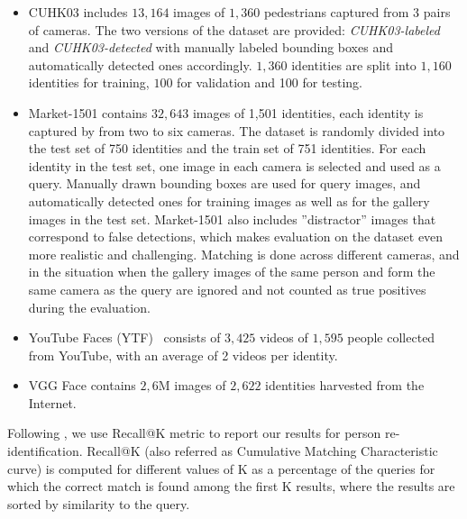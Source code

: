 \begin{itemize}
    \item CUHK03 \citep{Li14} includes $13,164$ images of $1,360$ pedestrians captured from 3 pairs of cameras. The two versions of the dataset are provided: \textit{CUHK03-labeled} and \textit{CUHK03-detected} with manually labeled bounding boxes and automatically detected ones accordingly.  $1,360$ identities are split into $1,160$ identities for training, $100$ for validation and 100 for testing.
    \item Market-1501 \citep{zheng2015scalable} contains $32,643$ images of 1,501 identities, each identity is captured by from two to six cameras. The dataset is randomly divided into the test set of 750 identities and the train set of 751 identities. For each identity in the test set, one image in each camera is selected and used as a query. Manually drawn bounding boxes are used for query images, and automatically detected ones for training images as well as for the gallery images in the test set. 
    Market-1501 also includes ''distractor'' images that correspond to false detections, which makes evaluation on the dataset even more realistic and challenging. Matching is done across different cameras, and in the situation when the gallery images of the same person and form the same camera as the query are ignored and not counted as true positives during the evaluation. 
    \item YouTube Faces (YTF)~\citep{WolfHM11}   consists of $3,425$ videos of $1,595$
 people collected from YouTube, with an average of 2 videos per identity. 
     \item VGG Face \citep{parkhi2015deep} contains $2,6$M images of $2,622$ identities harvested from the Internet. 
 \end{itemize}


Following \citep{Li14}, we use Recall@K metric to report our results for person re-identification. Recall@K (also referred as Cumulative Matching Characteristic curve) is computed for different values of K as a percentage of the queries for which the correct match is found among the first K results, where the results are sorted by similarity to the query.


